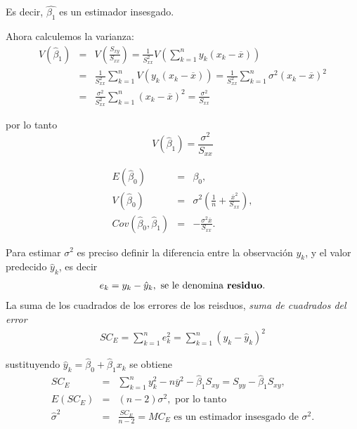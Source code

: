 \begin{Note}
Es decir, $\hat{\beta_{1}}$ es un estimador insesgado.
\end{Note}
Ahora calculemos la varianza:
\begin{eqnarray*}
V\left(\hat{\beta}_{1}\right)&=&V\left(\frac{S_{xy}}{S_{xx}}\right)=\frac{1}{S_{xx}^{2}}V\left(\sum_{k=1}^{n}y_{k}\left(x_{k}-\overline{x}\right)\right)\\
&=&\frac{1}{S_{xx}^{2}}\sum_{k=1}^{n}V\left(y_{k}\left(x_{k}-\overline{x}\right)\right)=\frac{1}{S_{xx}^{2}}\sum_{k=1}^{n}\sigma^{2}\left(x_{k}-\overline{x}\right)^{2}\\
&=&\frac{\sigma^{2}}{S_{xx}^{2}}\sum_{k=1}^{n}\left(x_{k}-\overline{x}\right)^{2}=\frac{\sigma^{2}}{S_{xx}}
\end{eqnarray*}







por lo tanto
\begin{equation}\label{Varianza.Beta.1}
V\left(\hat{\beta}_{1}\right)=\frac{\sigma^{2}}{S_{xx}}
\end{equation}
\begin{Prop}
\begin{eqnarray*}
E\left(\hat{\beta}_{0}\right)&=&\beta_{0},\\
V\left(\hat{\beta}_{0}\right)&=&\sigma^{2}\left(\frac{1}{n}+\frac{\overline{x}^{2}}{S_{xx}}\right),\\
Cov\left(\hat{\beta}_{0},\hat{\beta}_{1}\right)&=&-\frac{\sigma^{2}\overline{x}}{S_{xx}}.
\end{eqnarray*}
\end{Prop}

Para estimar $\sigma^{2}$ es preciso definir la diferencia entre la observaci\'on $y_{k}$, y el valor predecido $\hat{y}_{k}$, es decir
\begin{eqnarray*}
e_{k}=y_{k}-\hat{y}_{k},\textrm{ se le denomina \textbf{residuo}.}
\end{eqnarray*}
La suma de los cuadrados de los errores de los reisduos, \textit{suma de cuadrados del error}
\begin{eqnarray}
SC_{E}=\sum_{k=1}^{n}e_{k}^{2}=\sum_{k=1}^{n}\left(y_{k}-\hat{y}_{k}\right)^{2}
\end{eqnarray}






sustituyendo $\hat{y}_{k}=\hat{\beta}_{0}+\hat{\beta}_{1}x_{k}$ se obtiene
\begin{eqnarray*}
SC_{E}&=&\sum_{k=1}^{n}y_{k}^{2}-n\overline{y}^{2}-\hat{\beta}_{1}S_{xy}=S_{yy}-\hat{\beta}_{1}S_{xy},\\
E\left(SC_{E}\right)&=&\left(n-2\right)\sigma^{2},\textrm{ por lo tanto}\\
\hat{\sigma}^{2}&=&\frac{SC_{E}}{n-2}=MC_{E}\textrm{ es un estimador insesgado de }\sigma^{2}.
\end{eqnarray*}






